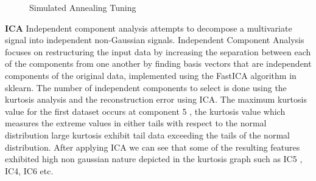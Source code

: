 \documentclass[a4paper,12pt]{article}
\begin{document}
\begin{figure}[!htb]
\begin{minipage}{0.33\textwidth}
   \end{minipage}\hfill
 \caption { Simulated Annealing Tuning}
\end{figure}

\textbf{ICA} Independent component analysis attempts to decompose a multivariate signal into independent non-Gaussian signals. Independent Component Analysis focuses on restructuring the input data by increasing the separation between each of the components from one another by finding basis vectors that are independent components of the original data, implemented using the FastICA algorithm in sklearn. The number of independent components to select is done using the kurtosis analysis and the reconstruction error using ICA. The maximum kurtosis value for the first dataset occurs at component 5 , the kurtosis value which measures the extreme values in either tails with respect to the normal distribution large kurtosis exhibit tail data exceeding the tails of the normal distribution. After applying ICA we can see that some of the resulting features exhibited high non gaussian nature depicted in the kurtosis graph such as IC5 , IC4, IC6 etc. 
\end{document}
